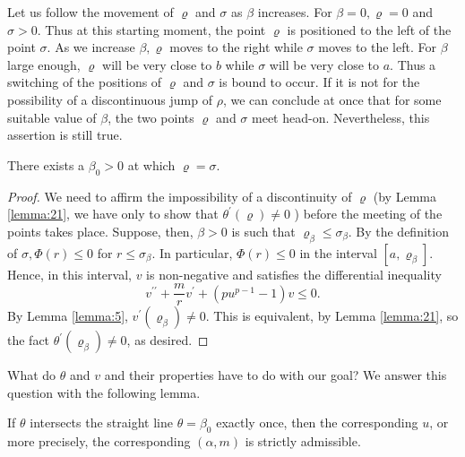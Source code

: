 Let us follow the movement of $\varrho$ and $\sigma$ as $\beta$ increases.
For $\beta=0, \varrho=0$ and $\sigma>0$. Thus at this starting moment,
the point $\varrho$ is positioned to the left of the point $\sigma$.
As we increase $\beta, \varrho$ moves to the right while $\sigma$ moves to the left.
For $\beta$ large enough, $\varrho$ will be very close to $b$ while $\sigma$
will be very close to $a$. Thus a switching of the positions of $\varrho$ and $\sigma$
is bound to occur. If it is not for the possibility of a discontinuous jump of $\rho$,
we can conclude at once that for some suitable value of $\beta$,
the two points $\varrho$ and $\sigma$ meet head-on. Nevertheless,
this assertion is still true.

\begin{lemma}\label{lemma:23}
  There exists a $\beta_0>0$ at which $\varrho=\sigma$.
\end{lemma}

\begin{proof}
  We need to affirm the impossibility of a discontinuity of $\varrho$ (by Lemma \ref{lemma:21},
  we have only to show that $\theta^{\prime}(\varrho) \neq 0$ ) before the meeting
  of the points takes place. Suppose, then, $\beta>0$ is such that
  $\varrho_\beta \leq \sigma_\beta$.
  By the definition of $\sigma, \Phi(r) \leq 0$ for $r \leq \sigma_\beta$.
  In particular, $\Phi(r) \leq 0$ in the interval $\left[a, \varrho_\beta\right]$.
  Hence, in this interval, $v$ is non-negative and satisfies the differential inequality
  \begin{equation}\label{eq:4.14}
    v^{\prime \prime}+\frac{m}{r} v^{\prime}+\left(p u^{p-1}-1\right) v \leq 0.
  \end{equation}
  By Lemma \ref{lemma:5}, $v^{\prime}\left(\varrho_\beta\right) \neq 0$. This is equivalent,
  by Lemma \ref{lemma:21}, so the fact $\theta^{\prime}\left(\varrho_\beta\right) \neq 0$, as desired.
\end{proof}

What do $\theta$ and $v$ and their properties have to do with our goal?
We answer this question with the following lemma.

\begin{lemma}\label{lemma:24}
  If $\theta$ intersects the straight line $\theta=\beta_0$ exactly once,
  then the corresponding $u$, or more precisely, the corresponding $(\alpha, m)$
  is strictly admissible.
\end{lemma}

